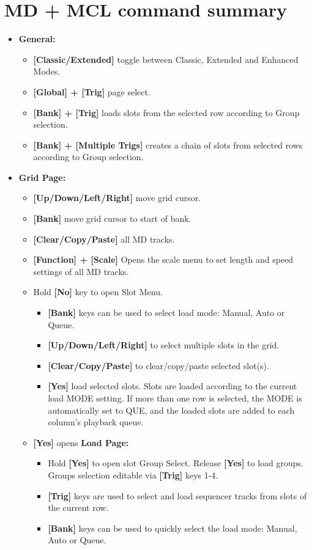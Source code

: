\section{MD + MCL command summary}
\begin{itemize}
\item \textbf{General:}
   \begin{itemize}
      \item \textbf{[Classic/Extended] } toggle between Classic, Extended and Enhanced Modes.
      \item \textbf{[Global] + [Trig] } page select.
      \item \textbf{[Bank] + [Trig]} loads slots from the selected row according to Group selection.
      \item \textbf{[Bank] + [Multiple Trigs]} creates a chain of slots from selected rows according to Group selection.
   \end{itemize}

\item \textbf{Grid Page:}
    \begin{itemize}
      \item \textbf{[Up/Down/Left/Right]} move grid cursor.
      \item \textbf{[Bank]} move grid cursor to start of bank.
      \item \textbf{[Clear/Copy/Paste]} all MD tracks.
      \item \textbf{[Function] + [Scale]} Opens the scale menu to set length and speed settings of all MD tracks.
      \item Hold \textbf{[No]} key to open Slot Menu.
      \begin{itemize}
                \item \textbf{[Bank]} keys can be used to select load mode: Manual, Auto or Queue.
                \item \textbf{[Up/Down/Left/Right]} to select multiple slots in the grid.
                \item \textbf{[Clear/Copy/Paste]} to clear/copy/paste selected slot(s).
                \item \textbf{[Yes]} load selected slots. Slots are loaded according to the current load MODE setting. If more than one row is selected, the MODE is automatically set to QUE, and the loaded slots are added to each column's playback queue.                
      \end{itemize}

\item \textbf{[Yes]} opens \textbf{Load Page:}
    \begin{itemize}
    \item Hold \textbf{[Yes]} to open slot Group Select. Release \textbf{[Yes]} to load groups. Groups selection editable via \textbf{[Trig]} keys 1-4.
    \item \textbf{[Trig]} keys are used to select and load sequencer tracks from slots of the current row.
    \item \textbf{[Bank]} keys can be used to quickly select the load mode: Manual, Auto or Queue.
    \end{itemize}
    

\end{itemize}
\end{itemize}
